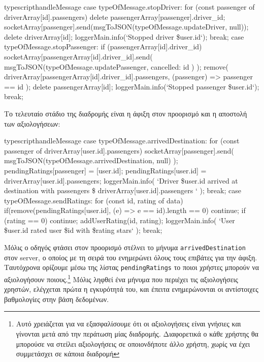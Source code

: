 \documentclass[../thesis.tex]{subfiles}
\begin{document}
\begin{codeblock}{typescript}{handleMessage}
  case typeOfMessage.stopDriver: {
    for (const passenger of driverArray[id].passengers){
      delete passengerArray[passenger].driver_id;
      socketArray[passenger].send(msgToJSON(typeOfMessage.updateDriver, null));
    }
    delete driverArray[id];
    loggerMain.info(`Stopped driver \${user.id}`);
    break;
  }
  case typeOfMessage.stopPassenger: {
    if (passengerArray[id].driver_id) {
      socketArray[passengerArray[id].driver_id].send(
        msgToJSON(typeOfMessage.updatePassenger, { cancelled: id })
      );
      remove(
        driverArray[passengerArray[id].driver_id].passengers,
        (passenger) => passenger == id
      );
    }
    delete passengerArray[id];
    loggerMain.info(`Stopped passenger \${user.id}`);
    break;
  }
\end{codeblock}

Το τελευταίο στάδιο της διαδρομής είναι η άφιξη στον προορισμό και η αποστολή των αξιολογήσεων: 

\begin{codeblock}{typescript}{handleMessage}
  case typeOfMessage.arrivedDestination: {
    for (const passenger of driverArray[user.id].passengers) {
      socketArray[passenger].send(
        msgToJSON(typeOfMessage.arrivedDestination, null)
      );
      pendingRatings[passenger] = [user.id];
    }
    pendingRatings[user.id] = driverArray[user.id].passengers;
    loggerMain.info(
      `Driver \${user.id} arrived at destination with passengers \${
        driverArray[user.id].passengers
      }`
    );
    break;
  }
  case typeOfMessage.sendRatings: {
    for (const {id, rating} of data) {
      if(remove(pendingRatings[user.id], (e) => e == id).length == 0) continue;
      if (rating == 0) continue;
      addUserRating(id, rating);
      loggerMain.info(
        `User \${user.id} rated user \${id} with \${rating} stars`
      );
    }
    break;
  }
\end{codeblock}

Μόλις ο οδηγός φτάσει στον προορισμό στέλνει το μήνυμα \texttt{arrivedDestination} στον server, ο οποίος με τη σειρά του ενημερώνει όλους τους επιβάτες για την άφιξη.
Ταυτόχρονα ορίζουμε μέσω της λίστας \texttt{pendingRatings} το ποιοι χρήστες μπορούν να αξιολογήσουν ποιους.\footnote{Αυτό χρειάζεται για να εξασφαλίσουμε ότι οι αξιολογήσεις είναι γνήσιες και γίνονται μετά από την περάτωση μίας διαδρομής. Διαφορετικά ο κάθε χρήστης θα μπορούσε να στείλει αξιολογήσεις σε οποιονδήποτε άλλο χρήστη, χωρίς να έχει συμμετάσχει σε κάποια διαδρομή}
Μόλις ληφθεί ένα μήνυμα που περιέχει τις αξιολογήσεις χρηστών, ελέγχεται πρώτα η εγκυρότητά του, και έπειτα ενημερώνονται οι αντίστοιχες βαθμολογίες στην βάση δεδομένων.
\end{document}
